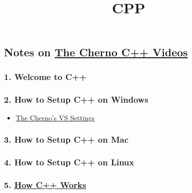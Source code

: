 \documentclass[11pt]{article}
\title{CPP}
\providecommand{\tightlist}{%
      \setlength{\itemsep}{0pt}\setlength{\parskip}{0pt}}
\begin{document}
    
    \maketitle
    
    

    
    \hypertarget{notes-on-the-cherno-c-videos}{%
\subsection{\texorpdfstring{Notes on
\href{https://www.youtube.com/playlist?list=PLlrATfBNZ98dudnM48yfGUldqGD0S4FFb}{The
Cherno C++
Videos}}{Notes on The Cherno C++ Videos}}\label{notes-on-the-cherno-c-videos}}

\hypertarget{welcome-to-c}{%
\subsubsection{1. Welcome to C++}\label{welcome-to-c}}

\hypertarget{how-to-setup-c-on-windows}{%
\subsubsection{2. How to Setup C++ on
Windows}\label{how-to-setup-c-on-windows}}

\begin{itemize}
\tightlist
\item
  \href{https://youtu.be/1OsGXuNA5cc?list=PLlrATfBNZ98dudnM48yfGUldqGD0S4FFb\&t=259}{The
  Cherno's VS Settings}
\end{itemize}

\hypertarget{how-to-setup-c-on-mac}{%
\subsubsection{3. How to Setup C++ on Mac}\label{how-to-setup-c-on-mac}}

\hypertarget{how-to-setup-c-on-linux}{%
\subsubsection{4. How to Setup C++ on
Linux}\label{how-to-setup-c-on-linux}}

\hypertarget{how-c-works}{%
\subsubsection{\texorpdfstring{5.
\href{https://www.youtube.com/watch?v=SfGuIVzE_Os\&list=PLlrATfBNZ98dudnM48yfGUldqGD0S4FFb\&index=5}{How
C++ Works}}{5. How C++ Works}}\label{how-c-works}}
\end{document}
